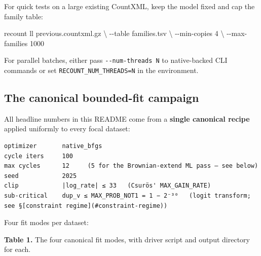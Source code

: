 \documentclass[
  10pt,
]{article}
\newenvironment{Shaded}{}{}
\newcommand{\AttributeTok}[1]{\textcolor[rgb]{0.49,0.56,0.16}{#1}}
\newcommand{\DataTypeTok}[1]{\textcolor[rgb]{0.56,0.13,0.00}{#1}}
\newcommand{\ExtensionTok}[1]{#1}
\newcommand{\NormalTok}[1]{#1}
\begin{document}
For quick tests on a large existing CountXML, keep the model fixed and
cap the family table:

\begin{Shaded}
\begin{Highlighting}[]
\ExtensionTok{recount}\NormalTok{ ll previous.countxml.gz }\DataTypeTok{\textbackslash{}}
    \AttributeTok{{-}{-}table}\NormalTok{ families.tsv }\DataTypeTok{\textbackslash{}}
    \AttributeTok{{-}{-}min{-}copies}\NormalTok{ 4 }\DataTypeTok{\textbackslash{}}
    \AttributeTok{{-}{-}max{-}families}\NormalTok{ 1000}
\end{Highlighting}
\end{Shaded}

For parallel batches, either pass \texttt{-\/-num-threads\ N} to
native-backed CLI commands or set \texttt{RECOUNT\_NUM\_THREADS=N} in
the environment.

\subsection{The canonical bounded-fit
campaign}\label{the-canonical-bounded-fit-campaign}

All headline numbers in this README come from a \textbf{single canonical
recipe} applied uniformly to every focal dataset:

\begin{verbatim}
optimizer       native_bfgs
cycle iters     100
max cycles      12     (5 for the Brownian-extend ML pass — see below)
seed            2025
clip            |log_rate| ≤ 33   (Csurös' MAX_GAIN_RATE)
sub-critical    dup_v ≤ MAX_PROB_NOT1 = 1 − 2⁻³⁰   (logit transform; see §[constraint regime](#constraint-regime))
\end{verbatim}

Four fit modes per dataset:

\textbf{Table 1.} The four canonical fit modes, with driver script and
output directory for each.
\end{document}
